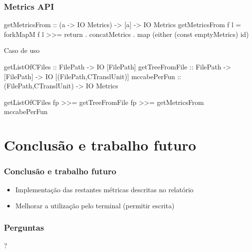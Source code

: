 \documentclass{beamer}
\begin{document}
\begin{frame}[fragile] \frametitle{Metrics API}
\begin{haskellcode}
getMetricsFrom :: (a -> IO Metrics) -> [a] -> IO Metrics
getMetricsFrom f l =
    forkMapM f l >>=
        return . concatMetrics . map (either (const emptyMetrics) id)
\end{haskellcode}
\begin{block}{Caso de uso}
\begin{haskellcode}
getListOfCFiles :: FilePath -> IO [FilePath]
getTreeFromFile :: FilePath -> [FilePath] -> IO [(FilePath,CTranslUnit)]
mccabePerFun :: (FilePath,CTranslUnit) -> IO Metrics

getListOfCFiles fp >>= getTreeFromFile fp >>= getMetricsFrom mccabePerFun
\end{haskellcode}
\end{block}
\end{frame}


\section{Conclusão e trabalho futuro}
\begin{frame} \frametitle{Conclusão e trabalho futuro}
\begin{itemize}
\item Implementação das restantes métricas descritas no relatório
\item Melhorar a utilização pelo terminal (permitir escrita)
\end{itemize}
\end{frame}

\begin{frame} \frametitle{Perguntas}
\begin{center}\huge{?}\end{center}
\end{frame}
\end{document}
